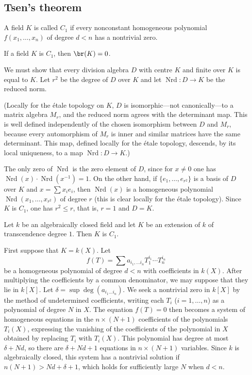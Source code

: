 \documentclass[oneside]{book}
\begin{document}
\subsection{Tsen's theorem}\label{I:3-2}

\begin{definition}\label{I:3-2-1}
A field $K$ is called $C_1$ if every nonconstant homogeneous polynomial
$f(x_1,\dotsc,x_n)$ of degree $d<n$ has a nontrivial zero.
\end{definition}

\begin{proposition}\label{I:3-2-2}
If a field $K$ is $C_1$, then $\br(K)=0$.
\end{proposition}

We must show that every division algebra $D$ with centre $K$ and finite
over $K$ is equal to $K$. Let $r^2$ be the degree of $D$ over $K$ and
let $\operatorname{Nrd}:D\to K$ be the reduced norm.

(Locally for the étale topology on $K$, $D$ is isomorphic---not
canonically---to a matrix algebra $M_r$, and the reduced norm agrees with
the determinant map. This is well defined independently of the chosen
isomorphism between $D$ and $M_r$, because every automorphism of $M_r$
is inner and similar matrices have the same determinant. This map, defined
locally for the étale topology, descends, by its local uniqueness, to a map
$\operatorname{Nrd}:D\to K$.)

The only zero of $\operatorname{Nrd}$ is the zero element of $D$, since
for $x\ne0$ one has
$\operatorname{Nrd}(x)\cdot\operatorname{Nrd}(x^{-1})=1$. On the other
hand, if $\{e_1,\dotsc,e_{r^2}\}$ is a basis of $D$ over $K$ and
$x=\sum x_ie_i$, then $\operatorname{Nrd}(x)$ is a homogeneous
polynomial $\operatorname{Nrd}(x_1,\dotsc,x_{r^2})$ of degree $r$
(this is clear locally for the étale topology). Since $K$ is $C_1$, one
has $r^2\leqslant r$, that is, $r=1$ and $D=K$.

\begin{theorem}[Tsen]\label{I:3-2-3}
Let $k$ be an algebraically closed field and let $K$ be an extension of
$k$ of transcendence degree $1$. Then $K$ is $C_1$.
\end{theorem}

First suppose that $K=k(X)$. Let
\[
  f(T) = \sum a_{i_1,\dotsc i_n} T_1^{i_1} \dotsm T_n^{i_n}
\]
be a homogeneous polynomial of degree $d<n$ with coefficients in
$k(X)$. After multiplying the coefficients by a common denominator, we
may suppose that they lie in $k[X]$. Let
$\delta=\sup\deg(a_{i_1\dotsc i_n})$. We seek a nontrivial zero in
$k[X]$ by the method of undetermined coefficients, writing each $T_i$
($i=1,\dotsc,n$) as a polynomial of degree $N$ in $X$. The equation
$f(T)=0$ then becomes a system of homogeneous equations in the
$n\times(N+1)$ coefficients of the polynomials $T_i(X)$, expressing the
vanishing of the coefficients of the polynomial in $X$ obtained by
replacing $T_i$ with $T_i(X)$. This polynomial has degree at most
$\delta+Nd$, so there are $\delta+Nd+1$ equations in
$n\times(N+1)$ variables. Since $k$ is algebraically closed, this system
has a nontrivial solution if $n(N+1)>Nd+\delta+1$, which holds for
sufficiently large $N$ when $d<n$.
\end{document}
